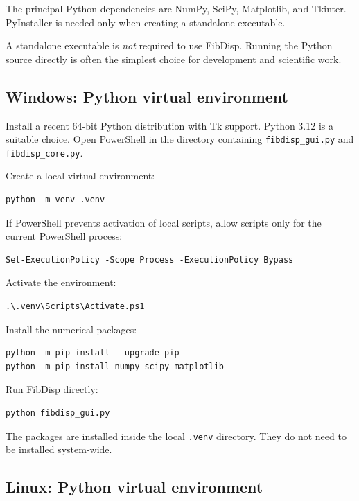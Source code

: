 \documentclass[11pt,a4paper]{article}
\begin{document}
The principal Python dependencies are NumPy, SciPy, Matplotlib, and Tkinter.
PyInstaller is needed only when creating a standalone executable.

A standalone executable is \emph{not} required to use FibDisp. Running the
Python source directly is often the simplest choice for development and
scientific work.

\subsection{Windows: Python virtual environment}

Install a recent 64-bit Python distribution with Tk support. Python 3.12 is a
suitable choice. Open PowerShell in the directory containing
\texttt{fibdisp\_gui.py} and \texttt{fibdisp\_core.py}.

Create a local virtual environment:

\begin{lstlisting}
python -m venv .venv
\end{lstlisting}

If PowerShell prevents activation of local scripts, allow scripts only for the
current PowerShell process:

\begin{lstlisting}
Set-ExecutionPolicy -Scope Process -ExecutionPolicy Bypass
\end{lstlisting}

Activate the environment:

\begin{lstlisting}
.\.venv\Scripts\Activate.ps1
\end{lstlisting}

Install the numerical packages:

\begin{lstlisting}
python -m pip install --upgrade pip
python -m pip install numpy scipy matplotlib
\end{lstlisting}

Run FibDisp directly:

\begin{lstlisting}
python fibdisp_gui.py
\end{lstlisting}

The packages are installed inside the local \texttt{.venv} directory. They do
not need to be installed system-wide.

\subsection{Linux: Python virtual environment}
\end{document}

